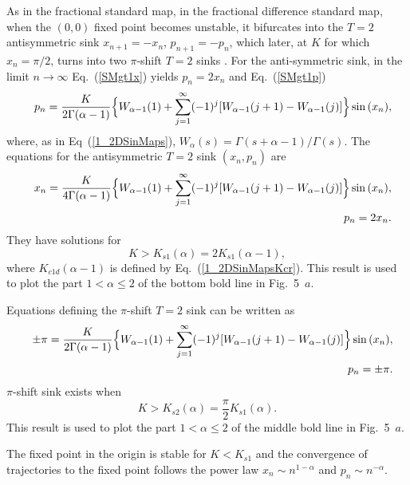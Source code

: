 \documentclass[graybox]{svmult}
\begin{document}
As in the fractional standard map, in the fractional difference standard map, when the $(0,0)$ fixed point becomes unstable,
it bifurcates into the $T=2$ antisymmetric sink $x_{n+1}=-x_n$,
$p_{n+1}=-p_n$, which later, at $K$ for which
$x_n=\pi/2$, turns into two $\pi$-shift $T=2$ sinks \cite{ME8}.
For the anti-symmetric sink, in the limit $n \rightarrow \infty$ Eq.~(\ref{SMgt1x}) yields $p_n=2x_n$ and Eq.~(\ref{SMgt1p})
 {\setlength\arraycolsep{0.5pt}   
\begin{eqnarray} 
&&p_n=\frac{K}{2\Gamma(\alpha-1)}\Bigl\{
  W_{\alpha-1}(1)+\sum^{\infty}_{j=1} (-1)^j[W_{\alpha-1}(j+1)-W_{\alpha-1}(j)]\Bigr\}\sin{(x_n)},
\label{1_2DSinMapsD1P} 
\end{eqnarray}
}
where, as in Eq~(\ref{1_2DSinMaps}),
$W_{\alpha}(s) ={\Gamma(s+\alpha-1)}/{\Gamma(s)}$.
The equations for
the antisymmetric $T=2$ sink $(x_n,p_n)$ are
{\setlength\arraycolsep{0.5pt}   
\begin{eqnarray} 
&&x_n=\frac{K}{4\Gamma(\alpha-1)}\Bigl\{
  W_{\alpha-1}(1) +\sum^{\infty}_{j=1} (-1)^j[W_{\alpha-1}(j+1)-W_{\alpha-1}(j)]\Bigr\}\sin{(x_n)},
\label{1_2DSinMapsD1Xnnn} \\
&&p_n=2x_n.
\label{1_2DSinMapsD1XPnn}
\end{eqnarray}
}
They have solutions for
\begin{equation}
K>K_{s1}(\alpha)=2K_{s1}(\alpha-1),
\label{KCR1_2}
\end{equation}
where $K_{c1d}(\alpha-1)$ is defined by  Eq.~(\ref{1_2DSinMapsKcr}). This
result is used to plot the part $1<\alpha \le2$ of the bottom bold line %
in Fig.~5~$a$. 

Equations defining the $\pi$-shift $T=2$ sink can be written as 
{\setlength\arraycolsep{0.5pt}   
\begin{eqnarray} 
&&\pm \pi=\frac{K}{2\Gamma(\alpha-1)}\Bigl\{
  W_{\alpha-1}(1) +\sum^{\infty}_{j=1} (-1)^j[W_{\alpha-1}(j+1)-W_{\alpha-1}(j)]\Bigr\}\sin{(x_n)},
\label{1_2DSinMapsD1Xn} \\
&&p_n=\pm \pi.
\label{1_2DSinMapsShift}
\end{eqnarray}
}
$\pi$-shift sink exists when 
\begin{equation}
K>K_{s2}(\alpha)=\frac{\pi}{2}K_{s1}(\alpha).
\label{KCR1_2Shift}
\end{equation}
This
result is used to plot the part $1<\alpha \le2$ of the middle bold line %
in Fig.~5~$a$. 


The fixed point in the origin is stable for $K<K_{s1}$ and the convergence of trajectories to the fixed point follows the power law 
$x_n \sim n^{1-\alpha}$ and $p_n \sim n^{-\alpha}$.
\end{document}
